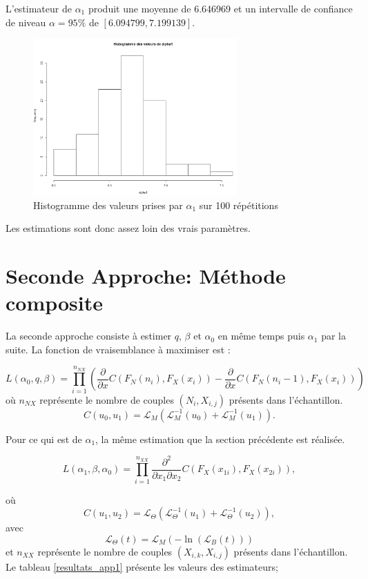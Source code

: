 \documentclass[11pt]{article}
\begin{document}
	L'estimateur de $\alpha_{1}$ produit  une moyenne de  6.646969 et un intervalle de confiance de niveau $\alpha = 95\% $ de $[6.094799,7.199139]$.

	\begin{figure}[H]
		\centering
		\includegraphics[height=6cm]{graph/alpha1lg.png}
		\caption[Paramètre $\alpha_{1}$]{Histogramme des valeurs prises par $\alpha_{1}$ sur 100 répétitions} 
		\label{alpha1lg}
	\end{figure}
		
	Les estimations sont donc assez loin des vrais paramètres. 

\section{Seconde Approche: Méthode composite}\label{sect_seconde_approche}

	La seconde approche consiste à estimer $q$, $\beta$ et $\alpha_{0}$ en même temps puis $\alpha_{1}$ par la suite. 
	La fonction de vraisemblance à maximiser  est :
	
	
\[ L(\alpha_{0},q,\beta) =\prod^{n_{NX}}_{i=1} \left(\frac{\partial}{\partial x} C(F_{N}(n_{i}),F_{X}(x_{i})) - \frac{\partial}{\partial x} C(F_{N}(n_{i}-1),F_{X}(x_{i}))\right) \]
	où $n_{NX}$ représente le nombre de couples $(N_{i},X_{i,j})$ présents dans l'échantillon.
	\[ C(u_{0},u_{1}) = \mathscr{L}_{M}(\mathscr{L}_{M}^{-1}(u_{0}) + \mathscr{L}_{M}^{-1}(u_{1}) ). \]
	
	Pour ce qui est de $\alpha_{1}$, la même estimation que la section précédente est réalisée.
	
	\begin{equation} \label{eq_vrais_alpha1_2}
	L(\alpha_{1}, \beta, \alpha_{0}) = \prod^{n_{XX}}_{i=1} \frac{\partial^{2}}{\partial x_{1}\partial x_{2}} C(F_{X}(x_{1i}),F_{X}(x_{2i})),
	\end{equation}
	
	où $$C(u_{1},u_{2}) = \mathscr{L}_{\Theta}(\mathscr{L}_{\Theta}^{-1}(u_{1}) + \mathscr{L}_{\Theta}^{-1}(u_{2}) ),$$
	avec    \[ \mathscr{L}_{\Theta}(t) = \mathscr{L}_{M}(-\ln(\mathscr{L}_{B}(t))) \]
	et $n_{XX}$ représente le nombre de couples $(X_{i,k},X_{i,j})$ présents dans l'échantillon. Le tableau \ref{resultats_app1} présente les valeurs des estimateurs;
\end{document}
